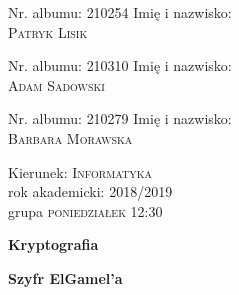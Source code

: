\documentclass{article}
\begin{document}
    
    \begin{titlepage}
    
    \begin{minipage}{0.33 \textwidth}
    \begin{flushleft}
    \large
    Nr. albumu: \textsc{210254}\linebreak
    Imię i nazwisko:\\
    \textsc{Patryk Lisik}
    \end{flushleft}
    \end{minipage}
    \hspace{0.2\textwidth}
    \begin{minipage}{0.33 \textwidth}
    \begin{flushleft}
    \large
    Nr. albumu: \textsc{210310}\linebreak
    Imię i nazwisko:\\
    \textsc{Adam Sadowski}
    \end{flushleft}
    \end{minipage}

    \vspace{1.5cm}

    \begin{minipage}{0.33 \textwidth}
        \begin{flushleft}
        \large
        Nr. albumu: \textsc{210279}\linebreak
        Imię i nazwisko:\\
        \textsc{Barbara Morawska}
        \end{flushleft}
        \end{minipage}
    
    \vspace{3cm}
    
    \begin{minipage}{0.9\textwidth}
    \begin{flushleft}
    \Large
    Kierunek: \textsc{Informatyka} \\
    rok akademicki: \textsc{2018/2019} \\
    grupa \textsc{poniedziałek 12:30} \linebreak\linebreak
    \end{flushleft}
    \end{minipage}
    
    \vspace{3cm}
    
    {\center\huge\bfseries Kryptografia \par}
    \vspace{1.5cm}
    {\center\huge\bfseries Szyfr ElGamel'a \par}
    
    \end{titlepage}
\end{document}
